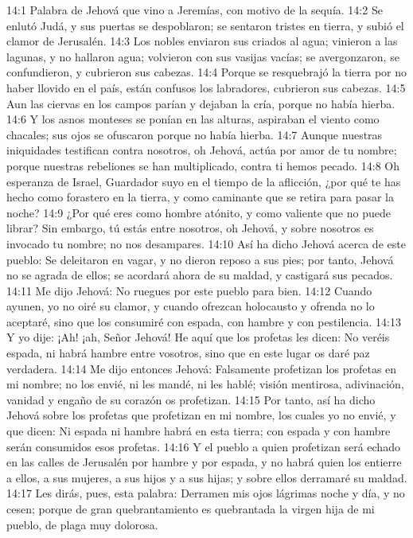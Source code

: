 14:1 Palabra de Jehová que vino a Jeremías, con motivo de la sequía. 
14:2 Se enlutó Judá, y sus puertas se despoblaron; se sentaron tristes en tierra, y subió el clamor de Jerusalén. 
14:3 Los nobles enviaron sus criados al agua; vinieron a las lagunas, y no hallaron agua; volvieron con sus vasijas vacías; se avergonzaron, se confundieron, y cubrieron sus cabezas. 
14:4 Porque se resquebrajó la tierra por no haber llovido en el país, están confusos los labradores, cubrieron sus cabezas. 
14:5 Aun las ciervas en los campos parían y dejaban la cría, porque no había hierba. 
14:6 Y los asnos monteses se ponían en las alturas, aspiraban el viento como chacales; sus ojos se ofuscaron porque no había hierba. 
14:7 Aunque nuestras iniquidades testifican contra nosotros, oh Jehová, actúa por amor de tu nombre; porque nuestras rebeliones se han multiplicado, contra ti hemos pecado. 
14:8 Oh esperanza de Israel, Guardador suyo en el tiempo de la aflicción, ¿por qué te has hecho como forastero en la tierra, y como caminante que se retira para pasar la noche? 
14:9 ¿Por qué eres como hombre atónito, y como valiente que no puede librar? Sin embargo, tú estás entre nosotros, oh Jehová, y sobre nosotros es invocado tu nombre; no nos desampares. 
14:10 Así ha dicho Jehová acerca de este pueblo: Se deleitaron en vagar, y no dieron reposo a sus pies; por tanto, Jehová no se agrada de ellos; se acordará ahora de su maldad, y castigará sus pecados. 
14:11 Me dijo Jehová: No ruegues por este pueblo para bien. 
14:12 Cuando ayunen, yo no oiré su clamor, y cuando ofrezcan holocausto y ofrenda no lo aceptaré, sino que los consumiré con espada, con hambre y con pestilencia. 
14:13 Y yo dije: ¡Ah! ¡ah, Señor Jehová! He aquí que los profetas les dicen: No veréis espada, ni habrá hambre entre vosotros, sino que en este lugar os daré paz verdadera. 
14:14 Me dijo entonces Jehová: Falsamente profetizan los profetas en mi nombre; no los envié, ni les mandé, ni les hablé; visión mentirosa, adivinación, vanidad y engaño de su corazón os profetizan. 
14:15 Por tanto, así ha dicho Jehová sobre los profetas que profetizan en mi nombre, los cuales yo no envié, y que dicen: Ni espada ni hambre habrá en esta tierra; con espada y con hambre serán consumidos esos profetas. 
14:16 Y el pueblo a quien profetizan será echado en las calles de Jerusalén por hambre y por espada, y no habrá quien los entierre a ellos, a sus mujeres, a sus hijos y a sus hijas; y sobre ellos derramaré su maldad. 
14:17 Les dirás, pues, esta palabra: Derramen mis ojos lágrimas noche y día, y no cesen; porque de gran quebrantamiento es quebrantada la virgen hija de mi pueblo, de plaga muy dolorosa. 
